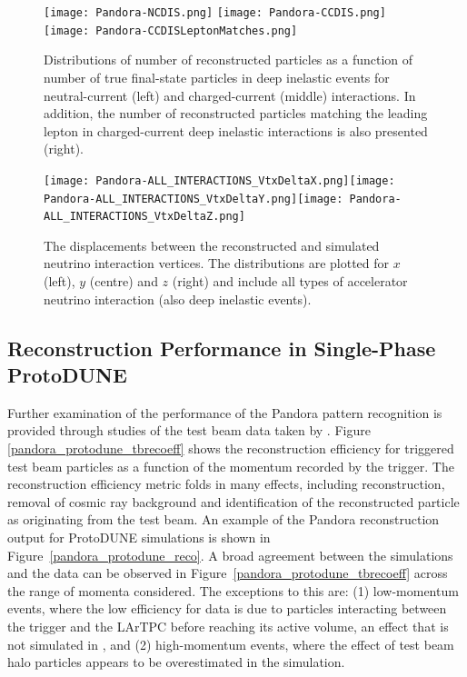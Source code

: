 \begin{figure}[!ht]
\centering
\texttt{[image: Pandora-NCDIS.png]}
\texttt{[image: Pandora-CCDIS.png]}
\texttt{[image: Pandora-CCDISLeptonMatches.png]}
\caption[Number of reconstructed particles per number of true final-state particles,  and ]{Distributions of number of reconstructed particles as a function of number of true final-state particles in deep inelastic events for neutral-current (left) and charged-current (middle) interactions. In addition, the number of reconstructed particles matching the leading lepton in charged-current deep inelastic interactions is also presented (right).}
\label{pandora_dis}
\end{figure}


\begin{figure}[!ht]
\centering
\texttt{[image: Pandora-ALL\_INTERACTIONS\_VtxDeltaX.png]}\texttt{[image: Pandora-ALL\_INTERACTIONS\_VtxDeltaY.png]}\texttt{[image: Pandora-ALL\_INTERACTIONS\_VtxDeltaZ.png]}
\caption[Displacements between reconstructed and simulated $\nu$ interaction vertices]{The displacements between the reconstructed and simulated neutrino interaction vertices. The distributions are plotted for $x$ (left), $y$ (centre) and $z$ (right) and include all types of accelerator neutrino interaction (also deep inelastic events).}
\label{pandora_vertex_resolution}
\end{figure}

\subsection{Reconstruction Performance in Single-Phase ProtoDUNE}
\label{sec:Pandora:ProtoDUNE}

Further examination of the performance of the Pandora pattern recognition is provided through studies of the test beam data taken by .  Figure \ref{pandora_protodune_tbrecoeff} shows the reconstruction efficiency for triggered test beam particles as a function of the momentum recorded by the trigger.  The reconstruction efficiency metric folds in many effects, including reconstruction, removal of cosmic ray background and identification of the reconstructed particle as originating from the test beam.  An example of the Pandora reconstruction output for ProtoDUNE  simulations is shown in Figure~\ref{pandora_protodune_reco}.  A broad agreement between the  simulations and the data can be observed in Figure~\ref{pandora_protodune_tbrecoeff} across the range of momenta considered.  The exceptions to this are: (1) low-momentum events, where the low efficiency for data is due to particles interacting between the trigger and the LArTPC before reaching its active volume, an effect that is not simulated in , and (2) high-momentum events, where the effect of test beam halo particles appears to be overestimated in the simulation.

